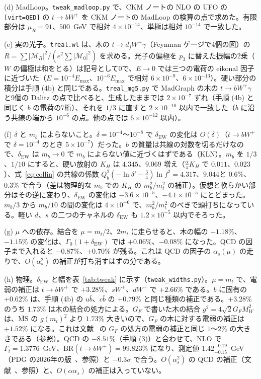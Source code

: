 \documentclass[a4paper,10pt]{ltjsarticle}
\newcommand{\MSbar}{\overline{\mathrm{MS}}}
\begin{document}
(d) MadLoop。\texttt{tweak\_madloop.py} で、CKM ノートの NLO の UFO の \texttt{[virt=QED]} の $t\to bW^+$ を CKM ノートの MadLoop の検算の点で求めた。有限部分は $\mu_R=91$、$500$~GeV で相対 $4\times10^{-14}$、単極は相対 $10^{-14}$ で一致した。

(e) 実の光子。\texttt{treal.wl} は、木の $t\to d_jW^+\gamma$（Feynman ゲージで4個の図）の $R=\sum|\mathcal M_R|^2/(e^2\sum|\mathcal M_0|^2)$ を求める。光子の偏極を $p_3$ に替えた振幅の2乗（$W$ の偏極は和をとる）は記号として0で、$E\to0$ では三つの電荷の eikonal 因子に近づいた（$E=10^{-4}E_{\max}$、$10^{-6}E_{\max}$ で相対 $6\times10^{-9}$、$6\times10^{-13}$）。硬い部分の積分は手順 (4b) と同じである。\texttt{treal\_mg5.py} で MadGraph の木の $t\to bW^+\gamma$ と9個の Dalitz の点で比べると、生成したままでは $2\times10^{-7}$ ずれ（手順 (4b) と同じく $b$ の電荷の7桁）、それを $1/3$ に直すと $2\times10^{-10}$ 以内で一致した（$b$ に沿う共線の端から $10^{-6}$ の点。他の点では $6\times10^{-12}$ 以内）。

(f) $\delta$ と $m_b$ によらないこと。$\delta=10^{-4}$〜$10^{-8}$ で $\delta_{\mathrm{EW}}$ の変化は $O(\delta)$（$t\to bW^+$ で $\delta=10^{-4}$ のとき $5\times10^{-7}$）だった。$b$ の質量は共線の対数を切るだけなので、$\delta_{\mathrm{EW}}$ は $m_b\to0$ で $m_b$ によらない値に近づくはずである（KLN）。$m_b$ を $1/3$、$1/10$ にすると、硬い放射の $K_H$ は $4.345$、$9.069$ 増え（$\frac\alpha\pi K_H$ で $0.011$、$0.023$）、式~\eqref{eq:collin} の共線の係数 $Q_b^2(-\ln\delta'-\frac34)\ln f^2=4.317$、$9.044$と $0.6\%$、$0.3\%$ で合う（差は物理的な $m_b$ での $K_H$ の $m_b^2/m_t^2$ の補正）。仮想と軟らかい部分はその逆に変わり、$\delta_{\mathrm{EW}}$ の変化は $-3.6\times10^{-5}$、$-4.1\times10^{-5}$ にとどまった。$m_b/3$ から $m_b/10$ の間の変化は $4\times10^{-6}$ で、$m_b^2/m_t^2$ のべきで頭打ちになっている。軽い $d$、$s$ の二つのチャネルの $\delta_{\mathrm{EW}}$ も $1.2\times10^{-5}$ 以内でそろった。

(g) $\mu$ への依存。結合を $\mu=m_t/2$、$2m_t$ に走らせると、木の幅の $+1.18\%$、$-1.15\%$ の変化は、$\Gamma_0(1+\delta_{\mathrm{EW}})$ では $+0.06\%$、$-0.08\%$ になった。QCD の因子まで入れると $-0.87\%$、$+0.70\%$ が残る。これは QCD の因子の $\alpha_s(\mu)$ の走りで、$O(\alpha_s^2)$ の補正が打ち消すはずの分である。

(h) 物理。$\delta_{\mathrm{EW}}$ と幅を表~\ref{tab:tweak} に示す（\texttt{tweak\_widths.py}）。$\mu=m_t$ で、電弱の補正は $t\to bW^+$ で $+3.28\%$、$sW^+$、$dW^+$ で $+2.66\%$ である。$b$ に固有の $+0.62\%$ は、手順 (4b) の $u\bar b$、$c\bar b$ の $+0.79\%$ と同じ種類の補正である。$+3.28\%$ のうち $1.73\%$ は木の結合の処方による。$G_F$ で書いた木の結合 $g^2=4\sqrt2G_FM_W^2$ は、$\MSbar$ の $g(m_t)^2$ より $1.73\%$ 大きいので、$G_F$ の木に対する電弱の補正は $+1.52\%$ になる。これは文献~\cite{ds91} の $G_F$ の処方の電弱の補正と同じ $1$〜$2\%$ の大きさである（参照）。QCD の $-8.51\%$（手順 (3)）と合わせて、NLO で $\Gamma_t=1.3776$~GeV、$\mathrm{BR}(t\to bW^+)=99.823\%$ になり、測定値 $1.42^{+0.19}_{-0.15}$~GeV（PDG の2026年の版~\cite{pdg26t}、参照）と $-0.3\sigma$ で合う。$O(\alpha_s^2)$ の QCD の補正（文献~\cite{cm98}、参照）と、$O(\alpha\alpha_s)$ の補正は入っていない。
\end{document}
